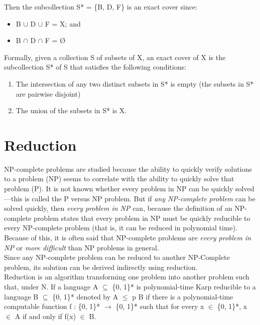 \documentclass[a4paper,oneside,11pt]{report}
\newcounter{row}
\newcounter{col}
\begin{document}
\vspace{0.8cm}
Then the subcollection S* = \{B, D, F\} is an exact cover since:
\begin{center}
\begin{minipage}{0.5\linewidth}
\begin{itemize}
\item B $\cup$ D $\cup$ F = X; and
\vspace{-0.5cm}
\item B $\cap$ D $\cap$ F = {\O}\\
\end{itemize}
\end{minipage}
\end{center}
Formally, given a collection S of subsets of X, an exact cover of X is the subcollection S* of S that satisfies the following conditions:
\begin{enumerate}[label=\alph*.]
\item The intersection of any two distinct subsets in S* is empty (the subsets in S* are pairwise disjoint)
\item The union of the subsets in S* is X.
\end{enumerate}


\section{Reduction}
NP-complete problems are studied because the ability to quickly verify solutions to a problem (NP) seems to correlate with the ability to quickly solve that problem (P). It is not known whether every problem in NP can be quickly solved—this is called the P versus NP problem. But if \textit{any NP-complete problem} can be solved quickly, then \textit{every problem in NP} can, because the definition of an NP-complete problem states that every problem in NP must be quickly reducible to every NP-complete problem (that is, it can be reduced in polynomial time). Because of this, it is often said that NP-complete problems are \textit{every problem in NP} or \textit{more difficult} than NP problems in general.\\

Since any NP-complete problem can be reduced to another NP-Complete problem, its solution can be derived indirectly using reduction.\\

Reduction is an algorithm transforming one problem into another problem such that, under N. If a language A $\subseteq$ \{0, 1\}* is polynomial-time Karp reducible to a language B $\subseteq$ \{0, 1\}* denoted by A $\leq$ p B if there is a polynomial-time computable function 
f : \{0, 1\}* $\rightarrow$ \{0, 1\}* such that for every x $\in$ \{0, 1\}*, x $\in$ A if and only if f(x) $\in$ B.
\end{document}
